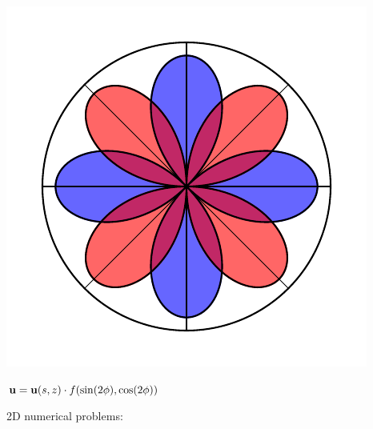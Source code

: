 \documentclass{article}
\renewcommand{\vec}[1]{\ensuremath{\mathbf{#1}}}
\begin{document}
\begin{center}
\begin{minipage}[t]{0.4\paperwidth}
        \begin{minipage}[c]{0.1\paperwidth}
            \includegraphics[width=\textwidth]{radpat_quad.pdf}
        \end{minipage}%
        \begin{minipage}[c]{0.4\paperwidth}
            $\scriptsize{\vec u = \vec u (s,z)} \cdot f(\sin(2\phi), \cos(2\phi))$ \\
        \end{minipage}%
    \end{minipage}%
    \begin{minipage}[t]{0.25\paperwidth}
        2D numerical problems:
    

\end{minipage}
\end{center}
\end{document}
